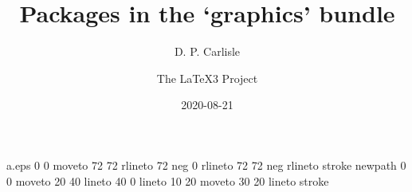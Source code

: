 
\begin{filecontents*}{a.eps}
0 0 moveto
72 72 rlineto
72 neg 0 rlineto
72 72 neg rlineto
stroke
newpath
0 0 moveto
20 40 lineto
40 0 lineto
10 20 moveto
30 20 lineto
stroke
\end{filecontents*}
\documentclass{ltxguide}

\usepackage{color,graphicx,shortvrb}



\renewcommand\star{{\ttfamily*}}

\let\package\textsf

\newlength{\gxlen}
\settowidth{\gxlen}{\package{graphicx}: }
\newcommand\gs{\makebox[\gxlen][l]{\package{graphics}:}}
\newcommand\gx{\makebox[\gxlen][l]{\package{graphicx}:}}

\MakeShortVerb{\|}


\title{Packages in the `graphics' bundle}
\author{D. P. Carlisle \and The \LaTeX3 Project}
\date{2020-08-21}

\maketitle

\tableofcontents

\section{Introduction}
This document serves as a user-manual for the packages \package{color},
\package{graphics}, and \package{graphicx}. Further documentation may be
obtained by processing the  source (|dtx|) files of the individual
packages.

